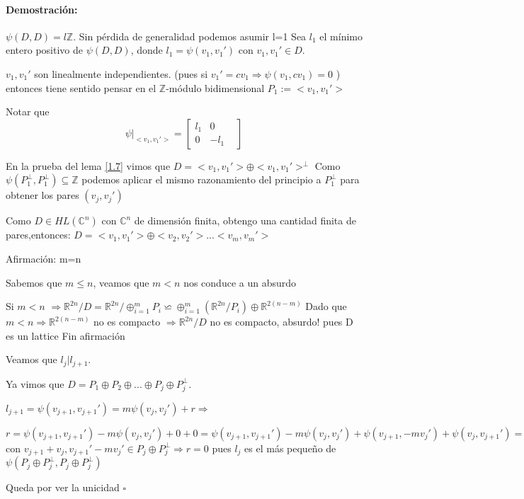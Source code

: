 \documentclass[12pt]{article}
\newenvironment{proof}{\paragraph{Demostración:}}{\hfill$\square$}
\begin{document}
\begin{proof}
$\psi(D,D)  = l \mathbb{Z}$. Sin pérdida de generalidad podemos asumir l=1
Sea $l_1$ el mínimo entero positivo de $\psi(D,D)$, donde $l_1=\psi(v_1,v_1')$ con $v_1,v_1' \in D$. 

$v_1,v_1'$ son linealmente independientes. (pues si $v_1'=c v_1 \Rightarrow \psi(v_1,c v_1)=0$ ) entonces tiene sentido
pensar en el $\mathbb{Z}$-módulo bidimensional $P_1:=<v_1,v_1'>$

Notar que $$
\psi|_{<v_1,v_1'>} = \begin{bmatrix}
                              l_1 & 0 &\\
                              0 & -l_1 &
                             \end{bmatrix}
$$

En la prueba del lema \ref{1.7} vimos que $D=<v_1,v_1'> \oplus <v_1,v_1'>^\bot$
Como $\psi(P_1^\bot,P_1^\bot) \subseteq \mathbb{Z}$ podemos aplicar el mismo razonamiento del principio a $P_1^\bot$ 
para obtener los pares $(v_j,v_j')$

Como $D \in HL(\mathbb{C}^n)$ con $\mathbb{C}^n$ de dimensión finita,  obtengo una cantidad finita de pares,entonces:
$D=<v_1,v_1'>\oplus<v_2,v_2'>...<v_m,v_m'>$

Afirmación: m=n

Sabemos que $m\leq n$, veamos que $m<n$ nos conduce a un absurdo

Si $m<n$ $\Rightarrow \mathbb{R}^{2n}/D=\mathbb{R}^{2n}/\oplus_{i=1}^m P_i \backsimeq \oplus_{i=1}^m (\mathbb{R}^{2n}/P_i) \oplus \mathbb{R}^{2(n-m)} $\newline
Dado que $m<n \Rightarrow  \mathbb{R}^{2(n-m)}$ no es compacto $\Rightarrow \mathbb{R}^{2n}/D$ no es compacto, absurdo! pues D es un lattice
Fin afirmación

Veamos que $l_j|l_{j+1}$.

Ya vimos que $D= P_1\oplus P_2 \oplus...\oplus P_j \oplus P_j^\bot$.

$l_{j+1}=\psi(v_{j+1},v_{j+1}')=m \psi(v_j,v_j') +r \Rightarrow$ 

$r=\psi(v_{j+1},v_{j+1}')-m \psi(v_j,v_j') + 0 + 0
=\psi(v_{j+1},v_{j+1}')-m \psi(v_j,v_j') +  \psi(v_{j+1},-mv_j') + \psi(v_j,v_{j+1}')
=\psi(v_{j+1} + v_j, v_{j+1}'-m v_j')$ con $v_{j+1} + v_j, v_{j+1}'-m v_j' \in P_j \oplus P_j^\bot \Rightarrow
r=0$ pues $l_j$ es el más pequeño de $\psi(P_j \oplus P_j^\bot, P_j \oplus P_j^\bot)$


{\color{red} Queda por ver la unicidad}
 \end{proof}
 
\end{document}

